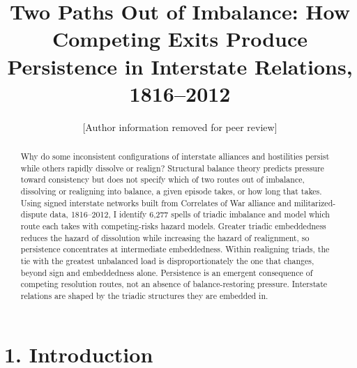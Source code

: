 \documentclass[Afour,sageh,times,doublespace]{sagej}
\begin{document}

\title{Two Paths Out of Imbalance: How Competing Exits Produce Persistence in Interstate Relations, 1816--2012}

\author{[Author information removed for peer review]}

\begin{abstract}
Why do some inconsistent configurations of interstate alliances and hostilities persist while others rapidly dissolve or realign? Structural balance theory predicts pressure toward consistency but does not specify which of two routes out of imbalance, dissolving or realigning into balance, a given episode takes, or how long that takes. Using signed interstate networks built from Correlates of War alliance and militarized-dispute data, 1816--2012, I identify 6,277 spells of triadic imbalance and model which route each takes with competing-risks hazard models. Greater triadic embeddedness reduces the hazard of dissolution while increasing the hazard of realignment, so persistence concentrates at intermediate embeddedness. Within realigning triads, the tie with the greatest unbalanced load is disproportionately the one that changes, beyond sign and embeddedness alone. Persistence is an emergent consequence of competing resolution routes, not an absence of balance-restoring pressure. Interstate relations are shaped by the triadic structures they are embedded in.
\end{abstract}


\maketitle

\section*{1. Introduction}
\end{document}
